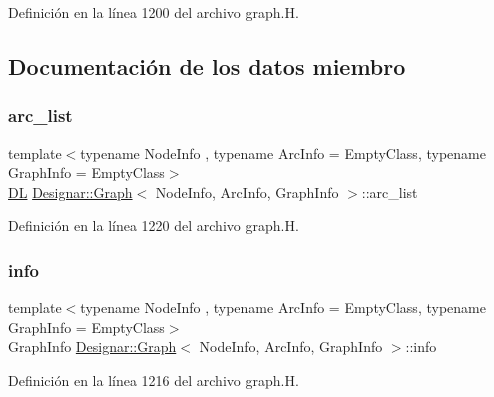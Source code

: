 Definición en la línea 1200 del archivo graph.\+H.



\subsection{Documentación de los datos miembro}
\mbox{\label{class_designar_1_1_graph_a8c809db7848c78f6718aad466ee959b2}} 
\subsubsection{\texorpdfstring{arc\+\_\+list}{arc\_list}}
{\footnotesize\ttfamily template$<$typename Node\+Info , typename Arc\+Info  = Empty\+Class, typename Graph\+Info  = Empty\+Class$>$ \\
\hyperlink{class_designar_1_1_d_l}{DL} \hyperlink{class_designar_1_1_graph}{Designar\+::\+Graph}$<$ Node\+Info, Arc\+Info, Graph\+Info $>$\+::arc\+\_\+list\hspace{0.3cm}{\ttfamily [protected]}}



Definición en la línea 1220 del archivo graph.\+H.

\mbox{\label{class_designar_1_1_graph_a2a8b41ce641ad2fb1b84a4d6b024bb1a}} 
\subsubsection{\texorpdfstring{info}{info}}
{\footnotesize\ttfamily template$<$typename Node\+Info , typename Arc\+Info  = Empty\+Class, typename Graph\+Info  = Empty\+Class$>$ \\
Graph\+Info \hyperlink{class_designar_1_1_graph}{Designar\+::\+Graph}$<$ Node\+Info, Arc\+Info, Graph\+Info $>$\+::info\hspace{0.3cm}{\ttfamily [protected]}}



Definición en la línea 1216 del archivo graph.\+H.

\mbox{\label{class_designar_1_1_graph_a31b0117b6d87816f703a4a5baa1fa6ce}} 
